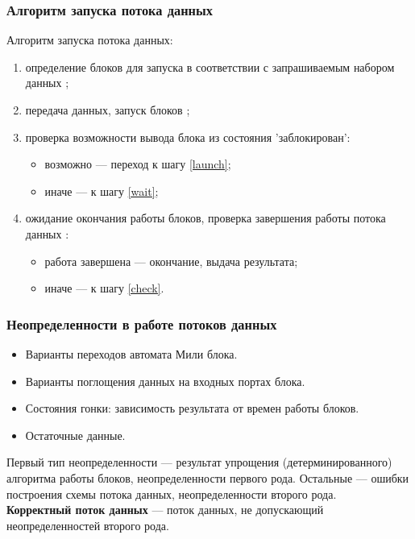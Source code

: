\documentclass[10pt,pdf,hyperref={unicode}]{beamer}
\begin{document}
\begin{frame}
  \frametitle{Алгоритм запуска потока данных}
  Алгоритм запуска потока данных:
  \begin{enumerate}
    \item определение блоков для запуска в соответствии с запрашиваемым набором данных \label{check};
    \item передача данных, запуск блоков \label{launch};
    \item проверка возможности вывода блока из состояния 'заблокирован':
      \begin{itemize}
        \item возможно --- переход к шагу \ref{launch};
        \item иначе --- к шагу \ref{wait};
      \end{itemize}
    \item ожидание окончания работы блоков, проверка завершения работы потока данных \label{wait}:
    \begin{itemize}
      \item работа завершена --- окончание, выдача результата;
      \item иначе --- к шагу \ref{check}.
    \end{itemize}
  \end{enumerate}
\end{frame}

\begin{frame}
  \frametitle{Неопределенности в работе потоков данных}
  \begin{itemize}
    \item Варианты переходов автомата Мили блока.
    \item Варианты поглощения данных на входных портах блока.
    \item Состояния гонки: зависимость результата от времен работы блоков.
    \item Остаточные данные.
  \end{itemize}
  Первый тип неопределенности --- результат упрощения (детерминированного) алгоритма работы блоков, неопределенности первого рода.
  Остальные --- ошибки построения схемы потока данных, неопределенности второго рода.\\
  \textbf{Корректный поток данных} --- поток данных, не допускающий неопределенностей второго рода.
\end{frame}
\end{document}
